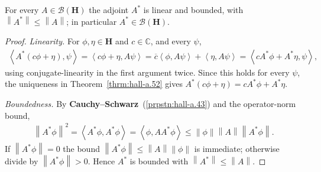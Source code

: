 \begin{proposition}
    \label{prpstn:adjoint-is-bounded}
    \leanok
    For every $A \in \mathcal{B}(\mathbf{H})$ the adjoint $A^*$ is linear and bounded, with $\left\| A^* \right\| \le \left\| A \right\|$; in particular $A^* \in \mathcal{B}(\mathbf{H})$.
\end{proposition}
\begin{proof}
    \leanok
\textit{Linearity.} For $\phi, \eta \in \mathbf{H}$ and $c \in \mathbb{C}$, and every $\psi$,
\begin{align}
    \left< A^*(c\phi + \eta), \psi \right> = \left< c\phi + \eta, A\psi \right> = \overline{c}\left< \phi, A\psi \right> + \left< \eta, A\psi \right> = \left< cA^*\phi + A^*\eta, \psi \right>,
\end{align}
using conjugate-linearity in the first argument twice. Since this holds for every $\psi$, the uniqueness in Theorem~\ref{thrm:hall-a.52} gives $A^*(c\phi+\eta) = cA^*\phi + A^*\eta$.

\textit{Boundedness.} By \textbf{Cauchy–Schwarz}~(\ref{prpstn:hall-a.43}) and the operator-norm bound,
\begin{align}
    \left\| A^*\phi \right\|^2 = \left< A^*\phi, A^*\phi \right> = \left< \phi, A A^*\phi \right> \le \left\| \phi \right\| \left\| A \right\| \left\| A^*\phi \right\|.
\end{align}
If $\left\| A^*\phi \right\| = 0$ the bound $\left\| A^*\phi \right\| \le \left\| A \right\| \left\| \phi \right\|$ is immediate; otherwise divide by $\left\| A^*\phi \right\| > 0$. Hence $A^*$ is bounded with $\left\| A^* \right\| \le \left\| A \right\|$.
\end{proof}

